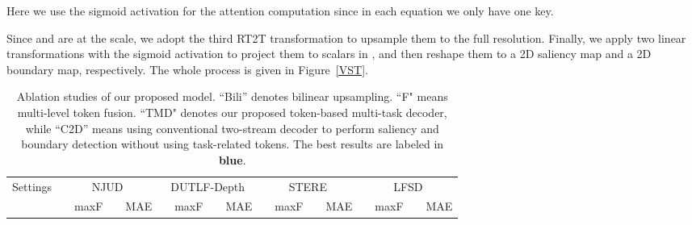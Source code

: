\documentclass[10pt,twocolumn,letterpaper]{article}
\def\blu#1{\textbf{\color{blue} #1}} \def\red#1{\textbf{\color{red}\underline{#1}}}
\begin{document}
Here we use the sigmoid activation for the attention computation since in each equation we only have one key.

Since  and  are at the  scale, we adopt the third RT2T transformation to upsample them to the full resolution.  Finally, we apply two linear transformations with the sigmoid activation to project them to scalars in , and then reshape them to a 2D saliency map and a 2D boundary map, respectively. The whole process is given in Figure~\ref{VST}.




\begin{table*}[t]
\centering
\scriptsize
\renewcommand{\arraystretch}{1.0}
\renewcommand{\tabcolsep}{1.0mm}
\caption{Ablation studies of our proposed model. ``Bili'' denotes bilinear upsampling. ``F" means multi-level token fusion. ``TMD" denotes our proposed token-based multi-task decoder, while ``C2D'' means using conventional two-stream decoder to perform saliency and boundary detection without using task-related tokens. The best results are labeled in \blu{blue}.
}
\begin{tabular}{l|l|cccc|cccc|cccc|cccc}
\hline
\multicolumn{2}{l|}{\multirow{2}{*}{Settings}} & \multicolumn{4}{c|}{NJUD \cite{ju2014njud}} & \multicolumn{4}{c|}{DUTLF-Depth \cite{Piao2019dmra}} & \multicolumn{4}{c|}{STERE \cite{niu2012stere}} & \multicolumn{4}{c}{LFSD \cite{li2014lfsd}}\\
\multicolumn{2}{l|}{} & \multicolumn{1}{l}{} & \multicolumn{1}{l}{maxF } & \multicolumn{1}{l}{} & \multicolumn{1}{l|}{MAE }
                      & \multicolumn{1}{l}{} & \multicolumn{1}{l}{maxF } & \multicolumn{1}{l}{} & \multicolumn{1}{l|}{MAE }
                      & \multicolumn{1}{l}{} & \multicolumn{1}{l}{maxF } & \multicolumn{1}{l}{} & \multicolumn{1}{l|}{MAE }
                      & \multicolumn{1}{l}{} & \multicolumn{1}{l}{maxF } & \multicolumn{1}{l}{} & \multicolumn{1}{l}{MAE }
  \\ \hline


\end{tabular}
\end{table*}
\end{document}
